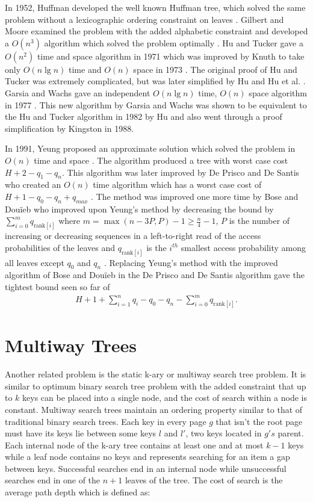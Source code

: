 \documentclass[letterpaper,12pt,titlepage,oneside,final]{book}
\theoremstyle{plain}
\begin{document}
In 1952, Huffman developed the well known Huffman tree, which solved the same problem without a lexicographic ordering constraint on leaves \cite{huffman1952method}. Gilbert and Moore examined the problem with the added alphabetic constraint and developed a $O(n^3)$ algorithm which solved the problem optimally \cite{gilbert1959variable}. Hu and Tucker gave a $O(n^2)$ time and space algorithm in 1971 \cite{hu1971optimal} which was improved by Knuth to take only $O(n \lg n)$ time and $O(n)$ space in 1973 \cite{knuth1973sorting}. The original proof of Hu and Tucker was extremely complicated, but was later simplified by Hu \cite{hu1973new} and Hu et al. \cite{hu1979binary}. Garsia and Wachs gave an independent $O(n \lg n)$ time, $O(n)$ space algorithm in 1977 \cite{garsia1977new}. This new algorithm by Garsia and Wachs was shown to be equivalent to the Hu and Tucker algorithm in 1982 by Hu \cite{Hu1982Book} and also went through a proof simplification \cite{kingston1988new} by Kingston in 1988.

In 1991, Yeung proposed an approximate solution which solved the problem in $O(n)$ time and space \cite{yeung1991alphabetic}. The algorithm produced a tree with worst case cost $H + 2 - q_1-q_n$. This algorithm was later improved by De Prisco and De Santis who created an $O(n)$ time algorithm which has a worst case cost of $H+1-q_0-q_n+q_{max}$ \cite{de1993binary}. The method was improved one more time by Bose and Dou\"{i}eb who improved upon Yeung's method by decreasing the bound by $\sum_{i=0}^m q_{\text{rank}[i]}$ where $m=\max({n-3P,P})-1 \geq \frac{n}{4} - 1$, $P$ is the number of increasing or decreasing sequences in a left-to-right read of the access probabilities of the leaves and $q_{\text{rank}[i]}$ is the $i^{th}$ smallest access probability among all leaves except $q_0$ and $q_n$ \cite{bose2009efficient}. Replacing Yeung's method with the improved algorithm of Bose and Dou\"{i}eb in the De Prisco and De Santis algorithm gave the tightest bound seen so far of 
\begin{align*}
H+1+\sum_{i=1}^{n}q_i-q_0-q_n-\sum_{i=0}^m q_{\text{rank}[i]}. 
\end{align*}

\section{Multiway Trees} \label{sec:MWT}


Another related problem is the static k-ary or multiway search tree problem. It is similar to optimum binary search tree problem with the added constraint that up to $k$ keys can be placed into a single node, and the cost of search within a node is constant. Multiway search trees maintain an ordering property similar to that of traditional binary search trees. Each key in every page $g$ that isn't the root page must have its keys lie between some keys $l$ and $l'$, two keys located in $g's$ parent. Each internal node of the k-ary tree contains at least one and at most $k-1$ keys while a leaf node contains no keys and represents searching for an item a gap between keys. Successful searches end in an internal node while unsuccessful searches end in one of the $n+1$ leaves of the tree. The cost of search is the average path depth which is defined as:
\end{document}
